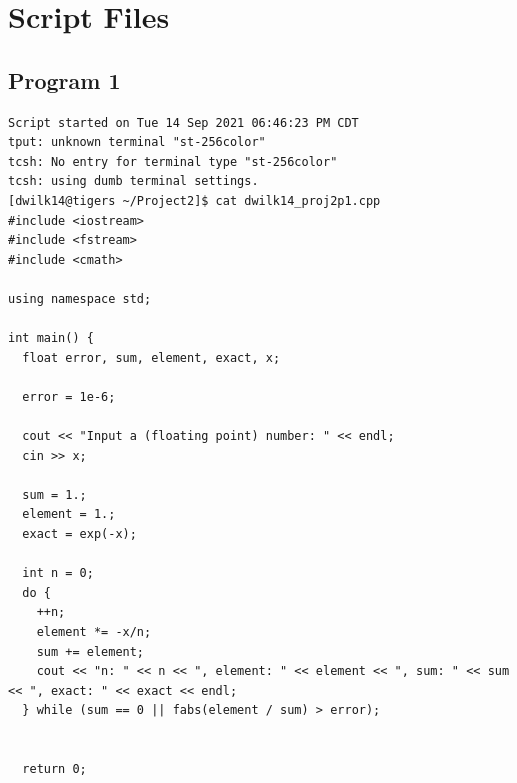 \documentclass[11pt]{article}
\begin{document}
\section*{Script Files}
\subsection{Program 1}
\begin{verbatim}
Script started on Tue 14 Sep 2021 06:46:23 PM CDT
tput: unknown terminal "st-256color"
tcsh: No entry for terminal type "st-256color"
tcsh: using dumb terminal settings.
[dwilk14@tigers ~/Project2]$ cat dwilk14_proj2p1.cpp
#include <iostream>
#include <fstream>
#include <cmath>

using namespace std;

int main() {
  float error, sum, element, exact, x;

  error = 1e-6;

  cout << "Input a (floating point) number: " << endl;
  cin >> x;

  sum = 1.;
  element = 1.;
  exact = exp(-x);

  int n = 0;
  do {
    ++n;
    element *= -x/n;
    sum += element;
    cout << "n: " << n << ", element: " << element << ", sum: " << sum << ", exact: " << exact << endl;
  } while (sum == 0 || fabs(element / sum) > error);


  return 0;


\end{verbatim}
\end{document}
